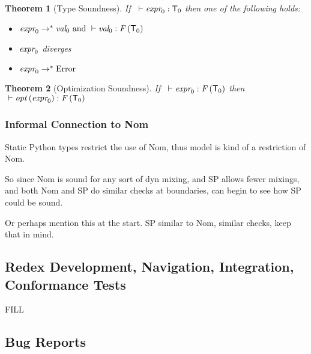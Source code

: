 \documentclass[english,cleveref,submission]{programming}
\newcommand{\SP}{Static Python}
\newcommand{\typefont}[1]{\mathsf{#1}}
\newcommand{\codefont}[1]{\emph{#1}}
\newcommand{\sptype}{\typefont{T}}
\newcommand{\spexpr}{\codefont{expr}}
\newcommand{\spvalue}{\codefont{val}}
\newcommand{\sprred}{\rightarrow^*}
\newcommand{\mfapply}[2]{#1\,(#2)}
\newcommand{\mffont}[1]{\mathit{#1}}
\newcommand{\mftypeF}[1]{\mfapply{\mffont{F}}{#1}}
\newcommand{\mfopt}[1]{\mfapply{\mffont{opt}}{#1}}
\newcommand{\sperror}{\mathrm{Error}}
\newtheorem{theorem}{Theorem}
\begin{document}
\begin{theorem}[Type Soundness]
  If\ \(~\vdash \spexpr_0 : \sptype_0\)
  then one of the following holds:
  \begin{itemize}
    \item
      \(\spexpr_0 \sprred \spvalue_0
        \mbox{ and }
        \vdash \spvalue_0 : \mftypeF{\sptype_0}
      \)
    \item
      \(\spexpr_0\) diverges
    \item
      \(\spexpr_0 \sprred \sperror\)
  \end{itemize}
\end{theorem}

\begin{theorem}[Optimization Soundness]
  If\ \(~\vdash \spexpr_0 : \mftypeF{\sptype_0}\)
  then\ \(~\vdash \mfopt{\spexpr_0} : \mftypeF{\sptype_0}\)
\end{theorem}



\subsubsection{Informal Connection to Nom}

\SP{} types restrict the use of Nom,
thus model is kind of a restriction of Nom.

So since Nom is sound for any sort of dyn mixing,
and SP allows fewer mixings,
and both Nom and SP do similar checks at boundaries,
can begin to see how SP could be sound.

Or perhaps mention this at the start.
SP similar to Nom, similar checks, keep that in mind.


\subsection{Redex Development, Navigation, Integration, Conformance Tests}

FILL


\subsection{Bug Reports}
\end{document}
